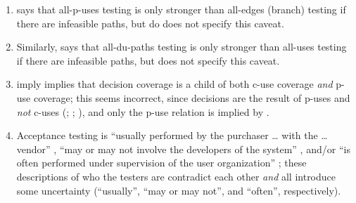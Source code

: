 \begin{enumerate}
          All-\acsp{du-path} testing is usually defined as exercising all
          ``loop-free control flow sub-paths from each variable definition to
          every use (both \acs{p-use} and \acs{c-use}) of that definition (with no
          intervening definitions)'' (\citealp[p.~29]{IEEE2021b}; similar in
          \citeyear[p.~125]{IEEE2017}; \citealp[p.~5\=/13]{SWEBOK2024};
          \citealp[p.~479]{PetersAndPedrycz2000}); however, paths containing
          simple cycles may also be required \citep[p.~425]{vanVliet2000}.
    \item %
           says that
          all-\acsp{p-use} testing is only stronger than all-edges (branch)
          testing if there are infeasible paths, but
          \citet[Fig.~F.1]{IEEE2021b} \ifnotpaper do
          \else does \fi not specify this caveat.
    \item %
          Similarly, \citet[pp.~432\==433]{vanVliet2000} says that
          all-\acsp{du-path} testing is only stronger than all-uses testing if
          there are infeasible paths, but \citet[p.~5\=/13]{SWEBOK2024} does
          not specify this caveat.
    \item %
          \citet[Fig.~12.31]{PetersAndPedrycz2000} \ifnotpaper imply
          \else implies \fi that decision coverage is a child of both \acs{c-use}
          coverage \emph{and} \acs{p-use} coverage; this seems incorrect, since
          decisions are the result of \acsp{p-use} and \emph{not} \acsp{c-use}
          (\citealp[pp.~5, 27]{IEEE2021b}; \citeyear[p.~332]{IEEE2017};
          \citealp[p.~424]{vanVliet2000}), and only the \acs{p-use} relation is
          implied by \citet[Fig.~F.1]{IEEE2021b}.
    \item %
          Acceptance testing is ``usually performed by the purchaser \dots{}
          with the \dots{} vendor'' \citep[p.~5]{IEEE2017}, ``may or may not
          involve the developers of the system'' \citep[p.~4\=/6]{SWEBOK2014},
          and/or ``is often performed under supervision of the user
          organization'' \citep[p.~439]{vanVliet2000}; these descriptions
          of who the testers are contradict each other \emph{and} all introduce
          some uncertainty
          (``usually'', ``may or may not'', and ``often'', respectively).


\end{enumerate}
